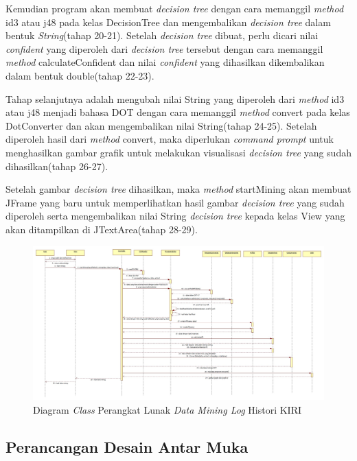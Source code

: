 Kemudian program akan membuat \textsl{decision tree} dengan cara memanggil \textsl{method} id3 atau j48 pada kelas DecisionTree dan mengembalikan \textsl{decision tree} dalam bentuk \textsl{String}(tahap 20-21). Setelah \textsl{decision tree} dibuat, perlu dicari nilai \textsl{confident} yang diperoleh dari \textsl{decision tree} tersebut dengan cara memanggil \textsl{method} calculateConfident dan nilai \textsl{confident} yang dihasilkan dikembalikan dalam bentuk double(tahap 22-23).

Tahap selanjutnya adalah mengubah nilai String yang diperoleh dari \textsl{method} id3 atau j48 menjadi bahasa DOT dengan cara memanggil \textsl{method} convert pada kelas DotConverter dan akan mengembalikan nilai String(tahap 24-25). Setelah diperoleh hasil dari \textsl{method} convert, maka diperlukan \textsl{command prompt} untuk menghasilkan gambar grafik untuk melakukan visualisasi \textsl{decision tree} yang sudah dihasilkan(tahap 26-27).

Setelah gambar \textsl{decision tree} dihasilkan, maka \textsl{method} startMining akan membuat JFrame yang baru untuk memperlihatkan hasil gambar \textsl{decision tree} yang sudah diperoleh serta mengembalikan nilai String \textsl{decision tree} kepada kelas View yang akan ditampilkan di JTextArea(tahap 28-29).


\begin{figure}[H]
\includegraphics[scale=0.35, angle =90]{Gambar/sequenceDiagram.jpg}
\caption[Diagram \textsl{Class} Perangkat Lunak \textsl{Data Mining Log} Histori KIRI]{Diagram \textsl{Class} Perangkat Lunak \textsl{Data Mining Log} Histori KIRI} 
\label{fig:sequenceDiagram}
\end{figure}

\subsection{Perancangan Desain Antar Muka}

